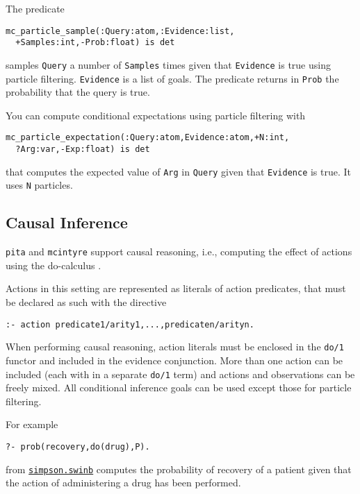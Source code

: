 The predicate
\begin{verbatim}
mc_particle_sample(:Query:atom,:Evidence:list,
  +Samples:int,-Prob:float) is det
\end{verbatim}
samples \verb|Query|  a number of \verb|Samples| times given that
\verb|Evidence|
is true using particle filtering. \verb|Evidence| is a list of goals.
The predicate returns in \verb|Prob| the probability that the query is true.

You can compute conditional expectations using particle filtering with
\begin{verbatim}
mc_particle_expectation(:Query:atom,Evidence:atom,+N:int,
  ?Arg:var,-Exp:float) is det
\end{verbatim}
that computes the expected value of \verb|Arg| in \verb|Query| given that
\verb|Evidence| is true.
It uses \verb|N| particles.

\subsection{Causal Inference}
\label{causal}

\verb|pita| and \verb|mcintyre| support causal reasoning, i.e., computing the effect of actions using the
do-calculus \cite{Pea00-book}.

Actions in this setting are represented as literals of action predicates, that must be declared as such
with the directive
\begin{verbatim}
:- action predicate1/arity1,...,predicaten/arityn.
\end{verbatim}
When performing causal reasoning, action literals must be enclosed in the \verb|do/1| functor and included in the evidence conjunction. More than one action can be included (each with in a separate
\verb|do/1| term) and actions and observations can be freely mixed.
All conditional inference goals can be used except those for particle filtering.

For example
\begin{verbatim}
?- prob(recovery,do(drug),P).
\end{verbatim}
from \href{http://cplint.eu/example/inference/simpson.swinb}{\texttt{simpson.swinb}}
computes the probability of recovery of a patient given that the action of administering a drug has
been performed.
